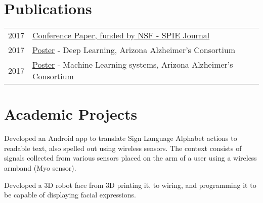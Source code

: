 \documentclass[hidelinks,letterpaper]{deedy-resume-openfont} %
\begin{document}
\begin{minipage}[t]{0.66\textwidth}



\section{Publications} 

\begin{tabular}{rl}
2017     & \href{https://www.researchgate.net/publication/321141639_Deep_Learning_based_Classification_of_FDG-PET_Data_for_Alzheimers_Disease_Categories}{\underline{Conference Paper}, funded by NSF - SPIE Journal} \\
2017	 & \href{http://gsl.lab.asu.edu/archive/Posters/AAC2017_Singh_DeepLearning.pdf}{\underline{Poster}} - Deep Learning, Arizona Alzheimer's Consortium \\
2017     & \href{http://gsl.lab.asu.edu/archive/Posters/AAC2017_Srivastava_3DPatch.pdf}{\underline{Poster}} - Machine Learning systems, Arizona Alzheimer's Consortium \\
\end{tabular}


\sectionsep
\section{Academic Projects}

\small Developed an Android app to translate Sign Language Alphabet actions to readable text, also spelled out using wireless sensors. The context consists of signals collected from various sensors placed on the arm of a user using a wireless armband (Myo sensor). 

\small Developed a 3D robot face from 3D printing it, to wiring, and programming it to be capable of displaying facial expressions.


\end{minipage}
\end{document}
